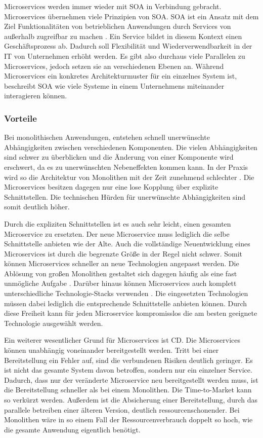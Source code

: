 Microservices werden immer wieder mit \ac{SOA} in Verbindung gebracht. Microservices übernehmen viele Prinzipien von \ac{SOA}. \ac{SOA} ist ein Ansatz mit dem Ziel Funktionalitäten von betrieblichen Anwendungen durch Services von außerhalb zugreifbar zu machen \parencite[vgl.][S. 2]{wolffMicroservices2018}. Ein Service bildet in diesem Kontext einen Geschäftsprozess ab. Dadurch soll Flexibilität und Wiederverwendbarkeit in der IT von Unternehmen erhöht werden. Es gibt also durchaus viele Parallelen zu Microservices, jedoch setzen sie an verschiedenen Ebenen an. Während Microservices ein konkretes Architekturmuster für ein einzelnes System ist, beschreibt \ac{SOA} wie viele Systeme in einem Unternehmens miteinander interagieren können.

\subsubsection{Vorteile}

Bei monolithischen Anwendungen, entstehen schnell unerwünschte Abhängigkeiten zwischen verschiedenen Komponenten. Die vielen Abhängigkeiten sind schwer zu überblicken und die Änderung von einer Komponente wird erschwert, da es zu unerwünschten Nebeneffekten kommen kann. In der Praxis wird so die Architektur von Monolithen mit der Zeit zunehmend schlechter \parencite[vgl.][S. 3]{wolffMicroservices2018}. Die Microservices besitzen dagegen nur eine lose Kopplung über explizite Schnittstellen. Die technischen Hürden für unerwünschte Abhängigkeiten sind somit deutlich höher.

Durch die expliziten Schnittstellen ist es auch sehr leicht, einen gesamten Microservice zu ersetzten. Der neue Microservice muss lediglich die selbe Schnittstelle anbieten wie der Alte. Auch die vollständige Neuentwicklung eines Microservices ist durch die begrenzte Größe in der Regel nicht schwer. Somit können Microservices schneller an neue Technologien angepasst werden. Die Ablösung von großen Monolithen gestaltet sich dagegen häufig als eine fast unmögliche Aufgabe \parencite[vgl.][S. 29]{newmanMicroservices2015}. Darüber hinaus können Microservices auch komplett unterschiedliche Technologie-Stacks verwenden \parencite[vgl.][S. 5]{wolffMicroservices2018}. Die eingesetzten Technologien müssen dabei lediglich die entsprechende Schnittstelle anbieten können. Durch diese Freiheit kann für jeden Microservice kompromisslos die am besten geeignete Technologie ausgewählt werden.

Ein weiterer wesentlicher Grund für Microservices ist \acl{CD}. Die Microservices können unabhängig voneinander bereitgestellt werden. Tritt bei einer Bereitstellung ein Fehler auf, sind die verbundenen Risiken deutlich geringer. Es ist nicht das gesamte System davon betroffen, sondern nur ein einzelner Service. Dadurch, dass nur der veränderte Microservice neu bereitgestellt werden muss, ist die Bereitstellung schneller als bei einem Monolithen. Die Time-to-Market kann so verkürzt werden. Außerdem ist die Absicherung einer Bereitstellung, durch das parallele betreiben einer älteren Version, deutlich ressourcenschonender. Bei Monolithen wäre in so einem Fall der Ressourcenverbrauch doppelt so hoch, wie die gesamte Anwendung eigentlich benötigt.

